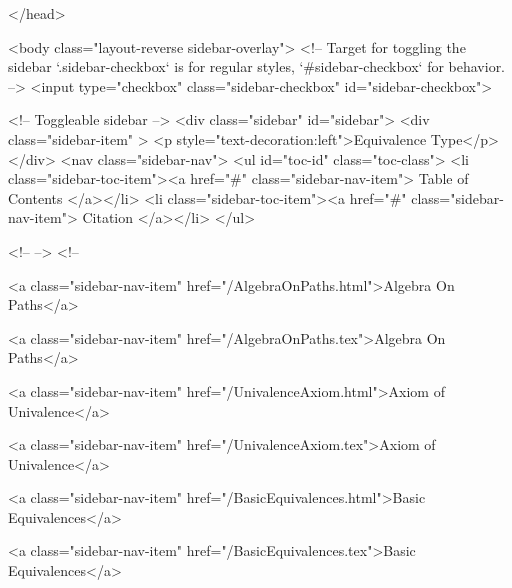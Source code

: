   
</head>




  <body class="layout-reverse sidebar-overlay">
    <!-- Target for toggling the sidebar `.sidebar-checkbox` is for regular
     styles, `#sidebar-checkbox` for behavior. -->
<input type="checkbox" class="sidebar-checkbox" id="sidebar-checkbox">

<!-- Toggleable sidebar -->
<div class="sidebar" id="sidebar">
  <div class="sidebar-item" >
    <p style="text-decoration:left">Equivalence Type</p>
  </div>
  <nav class="sidebar-nav">
    <ul id="toc-id" class="toc-class">
  <li class="sidebar-toc-item"><a href="#" class="sidebar-nav-item"> Table of Contents </a></li>
  <li class="sidebar-toc-item"><a href="#" class="sidebar-nav-item"> Citation </a></li>
</ul>


    <!--  -->
    <!-- 
      
    
      
    
      
    
      
    
      
        
      
    
      
        
          <a class="sidebar-nav-item" href="/AlgebraOnPaths.html">Algebra On Paths</a>
        
      
    
      
        
          <a class="sidebar-nav-item" href="/AlgebraOnPaths.tex">Algebra On Paths</a>
        
      
    
      
        
          <a class="sidebar-nav-item" href="/UnivalenceAxiom.html">Axiom of Univalence</a>
        
      
    
      
        
          <a class="sidebar-nav-item" href="/UnivalenceAxiom.tex">Axiom of Univalence</a>
        
      
    
      
        
          <a class="sidebar-nav-item" href="/BasicEquivalences.html">Basic Equivalences</a>
        
      
    
      
        
          <a class="sidebar-nav-item" href="/BasicEquivalences.tex">Basic Equivalences</a>
        
